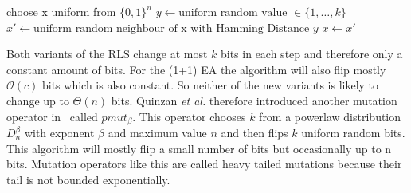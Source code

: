 \begin{algorithm}[t]
      \caption{\textsc{\RLSR}}\label{alg:rlsR}

      \DontPrintSemicolon %

      \BlankLine
      choose x uniform from ${\{0,1\}}^n$\;
      {
      $y \leftarrow \text{uniform random value }\in \{1,\dots,k\}$\;
      $x' \leftarrow \text{uniform random neighbour of x with Hamming Distance } y$\;
      {
      {
            $x \leftarrow x'$\;
      }
      }
      }
\end{algorithm}

Both variants of the RLS change at most $k$ bits in each step and therefore only a constant amount of bits.
For the (1+1) EA the algorithm will also flip mostly $\mathcal{O}(c)$ bits which is also constant.
So neither of the new variants is likely to change up to $\Theta(n)$ bits.
Quinzan \textit{et al.} therefore introduced another mutation operator in~\cite{friedrich2018evolutionary} called $pmut_\beta$.
This operator chooses $k$ from a powerlaw distribution $D^\beta_n$ with exponent $\beta$ and maximum value $n$ and then flips $k$ uniform random bits.
This algorithm will mostly flip a small number of bits but occasionally up to n bits.
Mutation operators like this are called heavy tailed mutations because their tail is not bounded exponentially.
